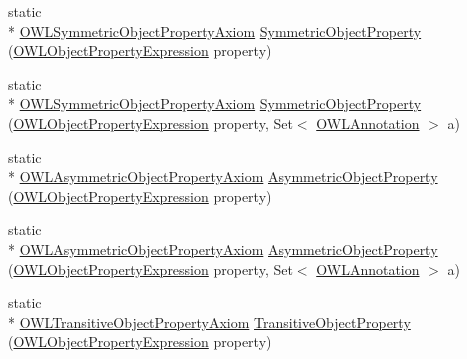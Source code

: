 \begin{DoxyCompactItemize}
\item 
static \\*
\hyperlink{interfaceorg_1_1semanticweb_1_1owlapi_1_1model_1_1_o_w_l_symmetric_object_property_axiom}{O\-W\-L\-Symmetric\-Object\-Property\-Axiom} \hyperlink{classorg_1_1semanticweb_1_1owlapi_1_1apibinding_1_1_o_w_l_functional_syntax_factory_a3c29e19218a8cb05a18fbc91e0070e9e}{Symmetric\-Object\-Property} (\hyperlink{interfaceorg_1_1semanticweb_1_1owlapi_1_1model_1_1_o_w_l_object_property_expression}{O\-W\-L\-Object\-Property\-Expression} property)
\item 
static \\*
\hyperlink{interfaceorg_1_1semanticweb_1_1owlapi_1_1model_1_1_o_w_l_symmetric_object_property_axiom}{O\-W\-L\-Symmetric\-Object\-Property\-Axiom} \hyperlink{classorg_1_1semanticweb_1_1owlapi_1_1apibinding_1_1_o_w_l_functional_syntax_factory_a292e977a351b6661f9a67a8f75dfaf0f}{Symmetric\-Object\-Property} (\hyperlink{interfaceorg_1_1semanticweb_1_1owlapi_1_1model_1_1_o_w_l_object_property_expression}{O\-W\-L\-Object\-Property\-Expression} property, Set$<$ \hyperlink{interfaceorg_1_1semanticweb_1_1owlapi_1_1model_1_1_o_w_l_annotation}{O\-W\-L\-Annotation} $>$ a)
\item 
static \\*
\hyperlink{interfaceorg_1_1semanticweb_1_1owlapi_1_1model_1_1_o_w_l_asymmetric_object_property_axiom}{O\-W\-L\-Asymmetric\-Object\-Property\-Axiom} \hyperlink{classorg_1_1semanticweb_1_1owlapi_1_1apibinding_1_1_o_w_l_functional_syntax_factory_a457eaff75508afd89f89bc6e1619df50}{Asymmetric\-Object\-Property} (\hyperlink{interfaceorg_1_1semanticweb_1_1owlapi_1_1model_1_1_o_w_l_object_property_expression}{O\-W\-L\-Object\-Property\-Expression} property)
\item 
static \\*
\hyperlink{interfaceorg_1_1semanticweb_1_1owlapi_1_1model_1_1_o_w_l_asymmetric_object_property_axiom}{O\-W\-L\-Asymmetric\-Object\-Property\-Axiom} \hyperlink{classorg_1_1semanticweb_1_1owlapi_1_1apibinding_1_1_o_w_l_functional_syntax_factory_a1c52a0fe921a6b6d15b59ae78256dc41}{Asymmetric\-Object\-Property} (\hyperlink{interfaceorg_1_1semanticweb_1_1owlapi_1_1model_1_1_o_w_l_object_property_expression}{O\-W\-L\-Object\-Property\-Expression} property, Set$<$ \hyperlink{interfaceorg_1_1semanticweb_1_1owlapi_1_1model_1_1_o_w_l_annotation}{O\-W\-L\-Annotation} $>$ a)
\item 
static \\*
\hyperlink{interfaceorg_1_1semanticweb_1_1owlapi_1_1model_1_1_o_w_l_transitive_object_property_axiom}{O\-W\-L\-Transitive\-Object\-Property\-Axiom} \hyperlink{classorg_1_1semanticweb_1_1owlapi_1_1apibinding_1_1_o_w_l_functional_syntax_factory_a2ba56dec4e809b389c8f10e4ee5b2a75}{Transitive\-Object\-Property} (\hyperlink{interfaceorg_1_1semanticweb_1_1owlapi_1_1model_1_1_o_w_l_object_property_expression}{O\-W\-L\-Object\-Property\-Expression} property)

\end{DoxyCompactItemize}
